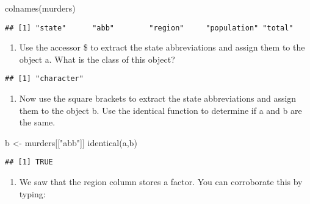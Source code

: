 \documentclass[
]{article}
\newenvironment{Shaded}{\begin{snugshade}}{\end{snugshade}}
\newcommand{\FunctionTok}[1]{\textcolor[rgb]{0.00,0.00,0.00}{#1}}
\newcommand{\NormalTok}[1]{#1}
\newcommand{\OtherTok}[1]{\textcolor[rgb]{0.56,0.35,0.01}{#1}}
\newcommand{\SpecialCharTok}[1]{\textcolor[rgb]{0.00,0.00,0.00}{#1}}
\newcommand{\StringTok}[1]{\textcolor[rgb]{0.31,0.60,0.02}{#1}}
\providecommand{\tightlist}{%
  \setlength{\itemsep}{0pt}\setlength{\parskip}{0pt}}
\begin{document}
\begin{Shaded}
\begin{Highlighting}[]
\FunctionTok{colnames}\NormalTok{(murders)}
\end{Highlighting}
\end{Shaded}

\begin{verbatim}
## [1] "state"      "abb"        "region"     "population" "total"
\end{verbatim}

\begin{enumerate}
\def\labelenumi{\arabic{enumi}.}
\setcounter{enumi}{2}
\tightlist
\item
  Use the accessor \$ to extract the state abbreviations and assign them
  to the object a. What is the class of this object?
\end{enumerate}

\begin{Shaded}
\end{Shaded}

\begin{verbatim}
## [1] "character"
\end{verbatim}

\begin{enumerate}
\def\labelenumi{\arabic{enumi}.}
\setcounter{enumi}{3}
\tightlist
\item
  Now use the square brackets to extract the state abbreviations and
  assign them to the object b. Use the identical function to determine
  if a and b are the same.
\end{enumerate}

\begin{Shaded}
\begin{Highlighting}[]
\NormalTok{b }\OtherTok{\textless{}{-}}\NormalTok{ murders[[}\StringTok{"abb"}\NormalTok{]]}
\FunctionTok{identical}\NormalTok{(a,b)}
\end{Highlighting}
\end{Shaded}

\begin{verbatim}
## [1] TRUE
\end{verbatim}

\begin{enumerate}
\def\labelenumi{\arabic{enumi}.}
\setcounter{enumi}{4}
\tightlist
\item
  We saw that the region column stores a factor. You can corroborate
  this by typing:
\end{enumerate}
\end{document}
